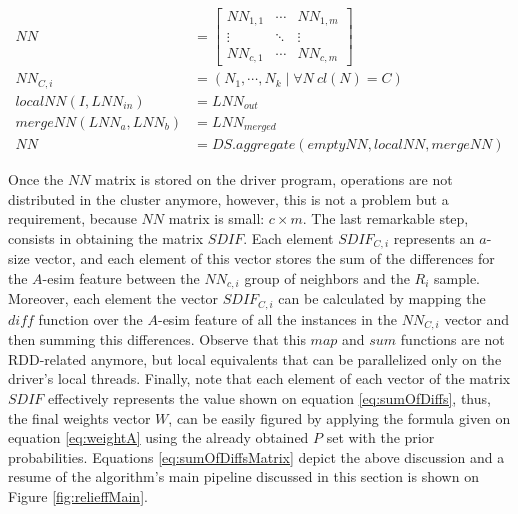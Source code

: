 
\begin{align}
\label{eq:nearestNeighbors}
NN & = \begin{bmatrix}
NN_{1,1} & \cdots  & NN_{1,m}\\ 
\vdots & \ddots  & \vdots \\ 
NN_{c,1} & \cdots & NN_{c,m} 
\end{bmatrix} \nonumber \\
NN_{C,i} & = (N_1,\cdots,N_k \mid \forall N \ cl(N) = C) \nonumber \\
localNN(I, LNN_{in}) & = LNN_{out}  \nonumber \\
mergeNN(LNN_a, LNN_b) & = LNN_{merged} \nonumber \\
NN & = DS.aggregate(emptyNN, localNN, mergeNN)
\end{align}

Once the $NN$ matrix is stored on the driver program, operations are not distributed in the cluster anymore, however, this is not a problem but a requirement, because $NN$ matrix is small: $c \times m$. The last remarkable step, consists in obtaining the matrix $SDIF$. Each element $SDIF_{C,i}$ represents an $a$-size vector, and each element of this vector stores the sum of the differences for the $A$-esim feature between the $NN_{c,i}$ group of neighbors and the $R_i$ sample. Moreover, each element the vector $SDIF_{C,i}$ can be calculated by mapping the $diff$ function over the $A$-esim feature of all the instances in the $NN_{C,i}$ vector and then summing this differences. Observe that this $map$ and $sum$ functions are not RDD-related anymore, but local equivalents that can be parallelized only on the driver's local threads. Finally, note that each element of each vector of the matrix $SDIF$ effectively represents the value shown on equation \ref{eq:sumOfDiffs}, thus, the final weights vector $W$, can be easily figured by applying the formula given on equation \ref{eq:weightA} using the already obtained $P$ set with the prior probabilities. Equations \ref{eq:sumOfDiffsMatrix} depict the above discussion and a resume of the algorithm's main pipeline discussed in this section is shown on Figure \ref{fig:relieffMain}.

